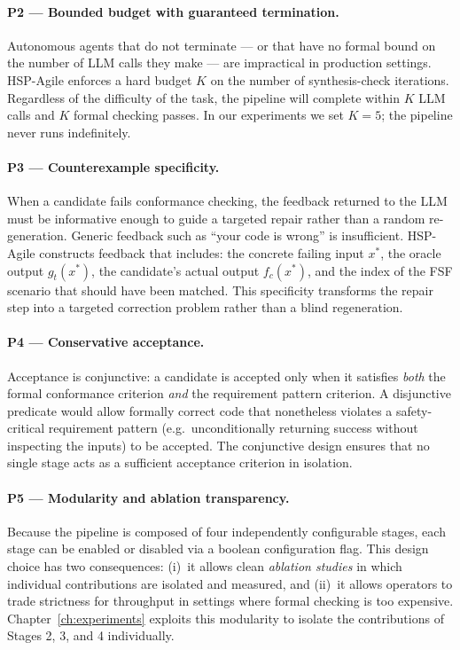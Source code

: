 \paragraph{P2 — Bounded budget with guaranteed termination.}
Autonomous agents that do not terminate — or that have no formal bound on the
number of LLM calls they make — are impractical in production settings.
HSP-Agile enforces a hard budget $K$ on the number of synthesis-check
iterations.  Regardless of the difficulty of the task, the pipeline will
complete within $K$ LLM calls and $K$ formal checking passes.  In our
experiments we set $K = 5$; the pipeline never runs indefinitely.

\paragraph{P3 — Counterexample specificity.}
When a candidate fails conformance checking, the feedback returned to the
LLM must be informative enough to guide a targeted repair rather than a
random re-generation.  Generic feedback such as ``your code is wrong'' is
insufficient.  HSP-Agile constructs feedback that includes: the concrete
failing input $x^*$, the oracle output $g_t(x^*)$, the candidate's
actual output $f_c(x^*)$, and the index of the FSF scenario that should have
been matched.  This specificity transforms the repair step into a targeted
correction problem rather than a blind regeneration.

\paragraph{P4 — Conservative acceptance.}
Acceptance is conjunctive: a candidate is accepted only when it satisfies
\emph{both} the formal conformance criterion \emph{and} the requirement
pattern criterion.  A disjunctive predicate would allow formally correct code
that nonetheless violates a safety-critical requirement pattern (e.g.\
unconditionally returning success without inspecting the inputs) to be
accepted.  The conjunctive design ensures that no single stage acts as a
sufficient acceptance criterion in isolation.

\paragraph{P5 — Modularity and ablation transparency.}
Because the pipeline is composed of four independently configurable stages,
each stage can be enabled or disabled via a boolean configuration flag.  This
design choice has two consequences: (i)~it allows clean \emph{ablation
studies} in which individual contributions are isolated and measured, and
(ii)~it allows operators to trade strictness for throughput in settings
where formal checking is too expensive.  Chapter~\ref{ch:experiments} exploits
this modularity to isolate the contributions of Stages 2, 3, and 4
individually.


